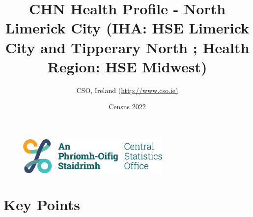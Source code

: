 \documentclass{article}
\title{CHN Health Profile - North Limerick City (IHA: HSE Limerick City and Tipperary North ;  Health Region: HSE Midwest) }
\date{Census 2022}
\author{CSO, Ireland  (\url{http://www.cso.ie)}}
\begin{document}


\begin{figure}
	\centering
\includegraphics[width =75mm]{../figures/CSO_Logo.png}
\end{figure}

				 
		   
						  
														  
																																													
												 
			 
\maketitle
					
													   
				 
						 
																																																																											   
				 
				  
  \pagebreak
    	    \tableofcontents

\pagebreak


\section{Key Points}
\end{document}
